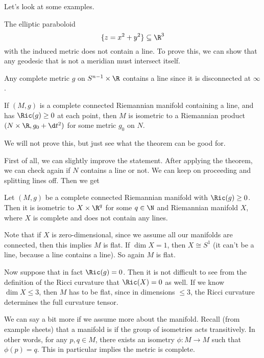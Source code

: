 \documentclass[a4paper]{article}
\begin{document}
Let's look at some examples.
\begin{eg}
  The elliptic paraboloid
  \[
    \{z = x^2 + y^2\} \subseteq \R^3
  \]
  with the induced metric does not contain a line. To prove this, we can show that any geodesic that is not a meridian must intersect itself.
\end{eg}

\begin{eg}
  Any complete metric $g$ on $S^{n - 1} \times \R$ contains a line since it is disconnected at $\infty$.
\end{eg}

\begin{thm}
  If $(M, g)$ is a complete connected Riemannian manifold containing a line, and has $\Ric(g) \geq 0$ at each point, then $M$ is isometric to a Riemannian product $(N \times \R, g_0 + \d t^2)$ for some metric $g_0$ on $N$.
\end{thm}
We will not prove this, but just see what the theorem can be good for.

First of all, we can slightly improve the statement. After applying the theorem, we can check again if $N$ contains a line or not. We can keep on proceeding and splitting lines off. Then we get
\begin{cor}
  Let $(M, g)$ be a complete connected Riemannian manifold with $\Ric(g) \geq 0$. Then it is isometric to $X \times \R^q$ for some $q \in \N$ and Riemannian manifold $X$, where $X$ is complete and does not contain any lines.
\end{cor}

Note that if $X$ is zero-dimensional, since we assume all our manifolds are connected, then this implies $M$ is flat. If $\dim X = 1$, then $X \cong S^1$ (it can't be a line, because a line contains a line). So again $M$ is flat.

Now suppose that in fact $\Ric(g) = 0$. Then it is not difficult to see from the definition of the Ricci curvature that $\Ric(X) = 0$ as well. If we know $\dim X \leq 3$, then $M$ has to be flat, since in dimensions $\leq 3$, the Ricci curvature determines the full curvature tensor.

We can say a bit more if we assume more about the manifold. Recall (from example sheets) that a manifold is  if the group of isometries acts transitively. In other words, for any $p, q \in M$, there exists an isometry $\phi: M \to M$ such that $\phi(p) = q$. This in particular implies the metric is complete.
\end{document}
